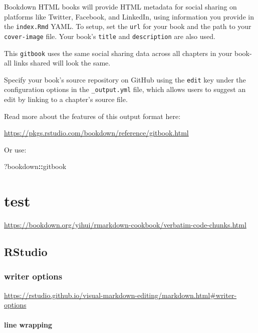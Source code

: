 \documentclass[
]{book}
\newenvironment{Shaded}{\begin{snugshade}}{\end{snugshade}}
\newcommand{\NormalTok}[1]{#1}
\newcommand{\SpecialCharTok}[1]{\textcolor[rgb]{0.81,0.36,0.00}{\textbf{#1}}}
\theoremstyle{definition}
\theoremstyle{definition}
\theoremstyle{definition}
\theoremstyle{definition}
\theoremstyle{remark}
\begin{document}
Bookdown HTML books will provide HTML metadata for social sharing on platforms like Twitter, Facebook, and LinkedIn, using information you provide in the \texttt{index.Rmd} YAML. To setup, set the \texttt{url} for your book and the path to your \texttt{cover-image} file. Your book's \texttt{title} and \texttt{description} are also used.

This \texttt{gitbook} uses the same social sharing data across all chapters in your book- all links shared will look the same.

Specify your book's source repository on GitHub using the \texttt{edit} key under the configuration options in the \texttt{\_output.yml} file, which allows users to suggest an edit by linking to a chapter's source file.

Read more about the features of this output format here:

\url{https://pkgs.rstudio.com/bookdown/reference/gitbook.html}

Or use:

\begin{Shaded}
\begin{Highlighting}[]
\NormalTok{?bookdown}\SpecialCharTok{::}\NormalTok{gitbook}
\end{Highlighting}
\end{Shaded}

\hypertarget{test}{%
\chapter{test}\label{test}}

\url{https://bookdown.org/yihui/rmarkdown-cookbook/verbatim-code-chunks.html}

\hypertarget{rstudio}{%
\section{RStudio}\label{rstudio}}

\hypertarget{writer-options}{%
\subsection{writer options}\label{writer-options}}

\url{https://rstudio.github.io/visual-markdown-editing/markdown.html\#writer-options}

\hypertarget{line-wrapping}{%
\subsubsection{line wrapping}\label{line-wrapping}}
\end{document}
